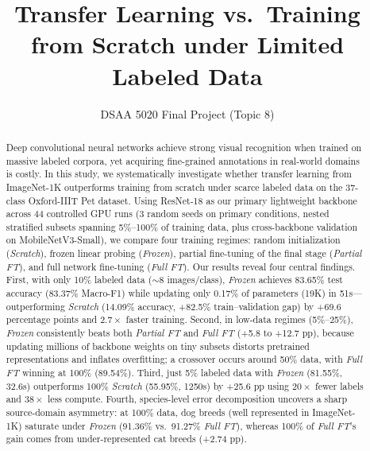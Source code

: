 \documentclass[sigconf,nonacm]{acmart}
\begin{document}
\title[Transfer Learning vs.\ Scratch under Limited Data]{Transfer Learning vs.\ Training from Scratch under Limited Labeled Data}

\author{DSAA 5020 Final Project (Topic 8)}

\begin{abstract}
Deep convolutional neural networks achieve strong visual recognition when trained on massive labeled corpora, yet acquiring fine-grained annotations in real-world domains is costly. In this study, we systematically investigate whether transfer learning from ImageNet-1K outperforms training from scratch under scarce labeled data on the 37-class Oxford-IIIT Pet dataset. Using ResNet-18 as our primary lightweight backbone across 44 controlled GPU runs (3 random seeds on primary conditions, nested stratified subsets spanning 5\%--100\% of training data, plus cross-backbone validation on MobileNetV3-Small), we compare four training regimes: random initialization (\emph{Scratch}), frozen linear probing (\emph{Frozen}), partial fine-tuning of the final stage (\emph{Partial FT}), and full network fine-tuning (\emph{Full FT}). Our results reveal four central findings. First, with only 10\% labeled data ($\sim$8 images/class), \emph{Frozen} achieves 83.65\% test accuracy (83.37\% Macro-F1) while updating only 0.17\% of parameters (19K) in 51s---outperforming \emph{Scratch} (14.09\% accuracy, +82.5\% train--validation gap) by +69.6 percentage points and $2.7\times$ faster training. Second, in low-data regimes (5\%--25\%), \emph{Frozen} consistently beats both \emph{Partial FT} and \emph{Full FT} (+5.8 to +12.7 pp), because updating millions of backbone weights on tiny subsets distorts pretrained representations and inflates overfitting; a crossover occurs around 50\% data, with \emph{Full FT} winning at 100\% (89.54\%). Third, just 5\% labeled data with \emph{Frozen} (81.55\%, 32.6s) outperforms 100\% \emph{Scratch} (55.95\%, 1250s) by +25.6 pp using $20\times$ fewer labels and $38\times$ less compute. Fourth, species-level error decomposition uncovers a sharp source-domain asymmetry: at 100\% data, dog breeds (well represented in ImageNet-1K) saturate under \emph{Frozen} (91.36\% vs.\ 91.27\% \emph{Full FT}), whereas 100\% of \emph{Full FT}'s gain comes from under-represented cat breeds (+2.74 pp).
\end{abstract}

\end{document}
